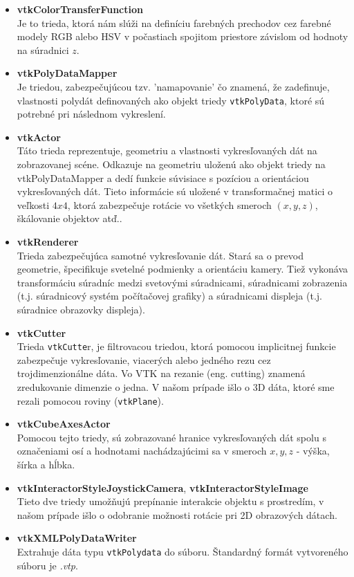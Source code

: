 \documentclass[a4paper,11pt,oneside]{article}%
\begin{document}
\begin{itemize}
\item \textbf{vtkColorTransferFunction} \\
Je to trieda, ktorá nám slúži na definíciu farebných prechodov cez farebné modely RGB alebo HSV v počastiach spojitom priestore závislom od hodnoty na súradnici $z$. 

\item \textbf{vtkPolyDataMapper} \\
Je triedou, zabezpečujúcou tzv. 'namapovanie' čo znamená, že zadefinuje, vlastnosti polydát definovaných ako objekt triedy \texttt{vtkPolyData}, ktoré sú potrebné pri následnom vykreslení.

\item \textbf{vtkActor} \\
Táto trieda reprezentuje, geometriu a vlastnosti vykresľovaných dát na zobrazovanej scéne. Odkazuje na geometriu uloženú ako objekt triedy na vtkPolyDataMapper a dedí funkcie súvisiace s pozíciou a orientáciou vykresľovaných dát. Tieto informácie sú uložené v transformačnej matici o veľkosti $4x4$, ktorá zabezpečuje rotácie vo všetkých smeroch $(x, y, z)$, škálovanie objektov atď..

\item \textbf{vtkRenderer} \\
Trieda zabezpečujúca samotné vykresľovanie dát. Stará sa o prevod geometrie, špecifikuje svetelné podmienky a orientáciu kamery. Tiež vykonáva transformáciu súradníc medzi svetovými súradnicami, súradnicami zobrazenia (t.j. súradnicový systém počítačovej grafiky) a súradnicami displeja (t.j.  súradnice obrazovky displeja).

\item \textbf{vtkCutter} \\
Trieda \texttt{vtkCutte}r, je filtrovacou triedou, ktorá pomocou implicitnej funkcie zabezpečuje vykresľovanie, viacerých alebo jedného rezu cez trojdimenzionálne dáta. Vo VTK na rezanie (eng. cutting) znamená zredukovanie dimenzie o jedna. V našom prípade išlo o 3D dáta, ktoré sme rezali pomocou roviny (\texttt{vtkPlane}). 

\item \textbf{vtkCubeAxesActor} \\
Pomocou tejto triedy, sú zobrazované hranice vykresľovaných dát spolu s označeniami osí a  hodnotami nachádzajúcimi sa v smeroch $x, y, z$ - výška, šírka a hĺbka.

\item \textbf{vtkInteractorStyleJoystickCamera}, \textbf{vtkInteractorStyleImage}  \\
Tieto dve triedy umožňujú prepínanie interakcie objektu s prostredím, v našom prípade išlo o odobranie možnosti rotácie pri 2D obrazových dátach.

\item \textbf{vtkXMLPolyDataWriter} \\
Extrahuje dáta typu \texttt{vtkPolydata} do súboru. Štandardný formát vytvoreného súboru je \textit{.vtp}. 
\end{itemize}
\end{document}
